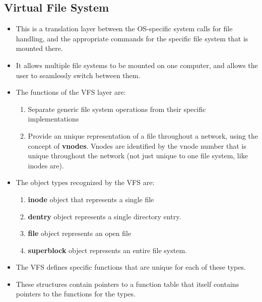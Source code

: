 \documentclass{article}
\theoremstyle{plain}
\theoremstyle{definition}
\begin{document}
\subsection{Virtual File System}
\begin{itemize}
    \item This is a translation layer between the OS-specific system calls for file handling, and the appropriate commands for the specific file system that is mounted there.
    
    \item It allows multiple file systems to be mounted on one computer, and allows the user to seamlessly switch between them. 
    
    \item The functions of the VFS layer are:
    \begin{enumerate}
        \item Separate generic file system operations from their specific implementations
        
        \item Provide an unique representation of a file throughout a network, using the concept of \textbf{vnodes}. Vnodes are identified by the vnode number that is unique throughout the network (not just unique to one file system, like inodes are). 
    \end{enumerate}
    
    \item The object types recognized by the VFS are:
    \begin{enumerate}
        \item \textbf{inode} object that represents a single file
        
        \item \textbf{dentry} object represents a single directory entry.
        
        \item \textbf{file} object represents an open file
        
        \item \textbf{superblock} object represents an entire file system. 
    \end{enumerate}
    
    \item The VFS defines specific functions that are unique for each of these types. 
    
    \item These structures contain pointers to a function table that itself contains pointers to the functions for the types. 
\end{itemize}
\end{document}
